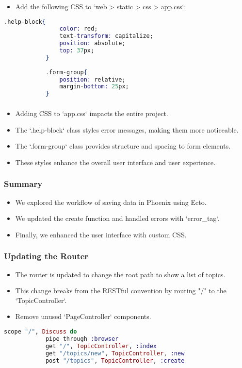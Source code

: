 \documentclass[aspectratio=169, table]{beamer}
\begin{document}
	\begin{frame}[fragile]
		\frametitle{}
		\begin{itemize}
			\item Add the following CSS to `web > static > css > app.css`:
		\end{itemize}
		\begin{lstlisting}[language=Elixir]
			.help-block{
				color: red;
				text-transform: capitalize;
				position: absolute;
				top: 37px;
			}
			
			.form-group{
				position: relative;
				margin-bottom: 25px;
			}
		\end{lstlisting}
	\end{frame}
	
	\begin{frame}
		\frametitle{}
		\begin{itemize}
			\item Adding CSS to `app.css` impacts the entire project.
			\item The `.help-block` class styles error messages, making them more noticeable.
			\item The `.form-group` class provides structure and spacing to form elements.
			\item These styles enhance the overall user interface and user experience.
		\end{itemize}
	\end{frame}
	
	\begin{frame}
		\frametitle{Summary}
		\begin{itemize}
			\item We explored the workflow of saving data in Phoenix using Ecto.
			\item We updated the create function and handled errors with `error\_tag`.
			\item Finally, we enhanced the user interface with custom CSS.
		\end{itemize}
	\end{frame}
	
	\begin{frame}[fragile]
		\frametitle{Updating the Router}
		\begin{itemize}
			\item The router is updated to change the root path to show a list of topics.
			\item This change breaks from the RESTful convention by routing "/" to the `TopicController`.
			\item Remove unused `PageController` components.
		\end{itemize}
		\begin{lstlisting}[language=Elixir]
			scope "/", Discuss do
			pipe_through :browser
			get "/", TopicController, :index
			get "/topics/new", TopicController, :new
			post "/topics", TopicController, :create
		\end{lstlisting}
	\end{frame}
	
\end{document}
